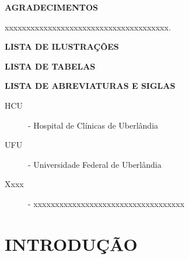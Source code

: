 \documentclass[12pt]{article}
\begin{document}
\thispagestyle{empty}

\newpage

\begin{center}
    \textbf{AGRADECIMENTOS}
\end{center}

\vspace{1cm}

xxxxxxxxxxxxxxxxxxxxxxxxxxxxxxxxxxxxxx.

\thispagestyle{empty}

\newpage

\begin{center}
    \textbf{LISTA DE ILUSTRAÇÕES}
\end{center}

\renewcommand{\listfigurename}{}
\listoffigures

\thispagestyle{empty}

\newpage

\begin{center}
    \textbf{LISTA DE TABELAS}
\end{center}

\renewcommand{\listtablename}{}
\listoftables

\thispagestyle{empty}

\newpage

\begin{center}
    \textbf{LISTA DE ABREVIATURAS E SIGLAS}
\end{center}

\vspace{0.5cm}

\begin{description}
    \item[HCU] - Hospital de Clínicas de Uberlândia
    \item[UFU] - Universidade Federal de Uberlândia
    \item[Xxxx] - xxxxxxxxxxxxxxxxxxxxxxxxxxxxxxxxxxx
\end{description}

\thispagestyle{empty}

\newpage

\renewcommand{\contentsname}{}  %
\vspace*{5cm}
\tableofcontents


\thispagestyle{empty}

\newpage
\section{INTRODUÇÃO}
\end{document}
